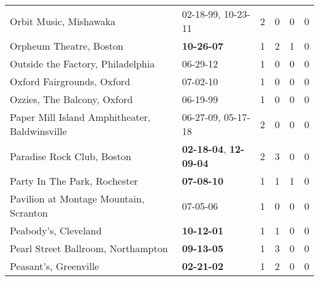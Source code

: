 \begin{longtable}{p{}p{}p{}p{}p{}p{}}
                                                       Orbit Music, Mishawaka &                    02-18-99\textsuperscript{}, 10-23-11\textsuperscript{} &  2 &  0 &  0 &  0 \\
                                                      Orpheum Theatre, Boston &                                       \textbf{10-26-07\textsuperscript{}} &  1 &  2 &  1 &  0 \\
                                            Outside the Factory, Philadelphia &                                                06-29-12\textsuperscript{} &  1 &  0 &  0 &  0 \\
                                                   Oxford Fairgrounds, Oxford &                                                07-02-10\textsuperscript{} &  1 &  0 &  0 &  0 \\
                                                  Ozzies, The Balcony, Oxford &                                                06-19-99\textsuperscript{} &  1 &  0 &  0 &  0 \\
                                Paper Mill Island Amphitheater, Baldwinsville &                    06-27-09\textsuperscript{}, 05-17-18\textsuperscript{} &  2 &  0 &  0 &  0 \\
                                                   Paradise Rock Club, Boston &  \textbf{02-18-04\textsuperscript{}}, \textbf{12-09-04\textsuperscript{}} &  2 &  3 &  0 &  0 \\
                                                 Party In The Park, Rochester &                                       \textbf{07-08-10\textsuperscript{}} &  1 &  1 &  1 &  0 \\
                                       Pavilion at Montage Mountain, Scranton &                                                07-05-06\textsuperscript{} &  1 &  0 &  0 &  0 \\
                                                         Peabody's, Cleveland &                                       \textbf{10-12-01\textsuperscript{}} &  1 &  1 &  0 &  0 \\
                                           Pearl Street Ballroom, Northampton &                                       \textbf{09-13-05\textsuperscript{}} &  1 &  3 &  0 &  0 \\
                                                        Peasant's, Greenville &                                       \textbf{02-21-02\textsuperscript{}} &  1 &  2 &  0 &  0 \\

\end{longtable}
